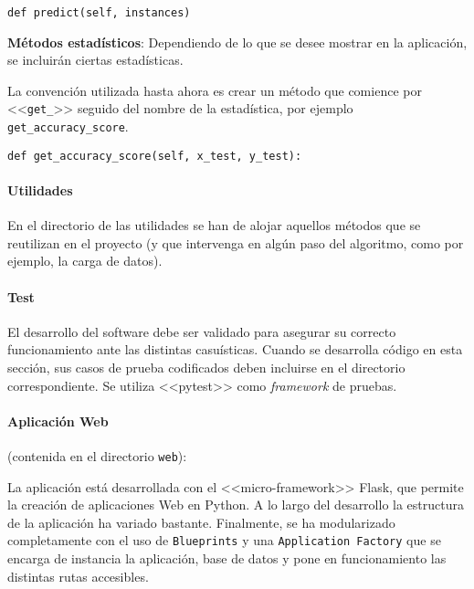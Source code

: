 \begin{tcolorbox}[colback=cyan!5!white,colframe=cyan!75!black,title=Cabecera predict]
\begin{verbatim}
def predict(self, instances)
\end{verbatim}
\end{tcolorbox}
    

\textbf{Métodos estadísticos}: Dependiendo de lo que se desee mostrar en la
aplicación, se incluirán ciertas estadísticas.

La convención utilizada hasta ahora es crear un método que comience por
<<\texttt{get\_}>> seguido del nombre de la estadística, por ejemplo
\texttt{get\_accuracy\_score}.

\begin{tcolorbox}[colback=cyan!5!white,colframe=cyan!75!black,title=Cabecera ejemplo estadística]
\begin{verbatim}
def get_accuracy_score(self, x_test, y_test):
\end{verbatim}
\end{tcolorbox}

\paragraph{Utilidades} En el directorio de las utilidades se han de alojar
aquellos métodos que se reutilizan en el proyecto (y que intervenga en algún paso
del algoritmo, como por ejemplo, la carga de datos). 

\paragraph{Test} El desarrollo del software debe ser validado para asegurar su
correcto funcionamiento ante las distintas casuísticas. Cuando se desarrolla
código en esta sección, sus casos de prueba codificados deben incluirse en el
directorio correspondiente. Se utiliza <<pytest>> como \textit{framework} de
pruebas.

\paragraph{Aplicación Web} (contenida en el directorio \texttt{web}):  

La aplicación está desarrollada con el <<micro-framework>> Flask, que permite la
creación de aplicaciones Web en Python. A lo largo del desarrollo la estructura
de la aplicación ha variado bastante. Finalmente, se ha modularizado
completamente con el uso de \texttt{Blueprints} y una \texttt{Application
Factory} que se encarga de instancia la aplicación, base de datos y pone en
funcionamiento las distintas rutas accesibles.

